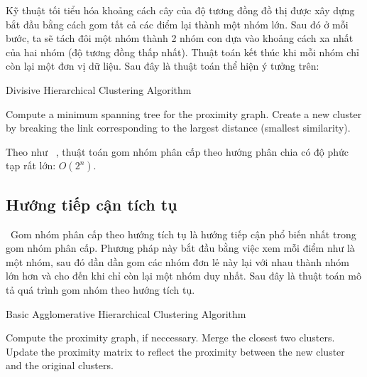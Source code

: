 Kỹ thuật tối tiểu hóa khoảng cách cây của độ tương đồng đồ thị được xây dựng bắt đầu bằng cách gom tất cả các điểm lại thành một nhóm lớn.
Sau đó ở mỗi bước, ta sẽ tách đôi một nhóm thành 2 nhóm con dựa vào khoảng cách xa nhất của hai nhóm (độ tương đồng thấp nhất).
Thuật toán kết thúc khi mỗi nhóm chỉ còn lại một đơn vị dữ liệu.
Sau đây là thuật toán thể hiện ý tưởng trên:

\begin{algorithm}
\caption{Divisive Hierarchical Clustering Algorithm}
\label{alg:Divisive}
\begin{algorithmic}[1]
\State Compute a minimum spanning tree for the proximity graph.
\Repeat
\State Create a new cluster by breaking the link corresponding to the largest distance (smallest similarity).
\end{algorithmic}
\end{algorithm}

Theo như ~\cite{wiki-HAC}, thuật toán gom nhóm phân cấp theo hướng phân chia có độ phức tạp rất lớn: $O(2^n)$.

		
		
\subsection{Hướng tiếp cận tích tụ}
\label{sec:htctt}
~\cite{Vipin-Kumar, hierarchical-clustering, cluster-analysis}Gom nhóm phân cấp theo hướng tích tụ là hướng tiếp cận phổ biến nhất trong gom nhóm phân cấp.
Phương pháp này bắt đầu bằng việc xem mỗi điểm như là một nhóm, sau đó dần dần gom các nhóm đơn lẻ này lại với nhau thành nhóm lớn hơn và cho đến khi chỉ còn lại một nhóm duy nhất.
Sau đây là thuật toán mô tả quá trình gom nhóm theo hướng tích tụ.

\begin{algorithm}
\caption{Basic Agglomerative Hierarchical Clustering Algorithm}
\label{agl:agglomerative}
\begin{algorithmic}[1]
\State Compute the proximity graph, if neccessary.
\Repeat
\State Merge the closest two clusters.
\State Update the proximity matrix to reflect the proximity between the new cluster and the original clusters.
\end{algorithmic}
\end{algorithm}

